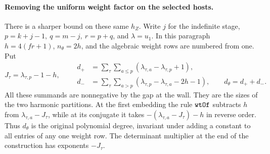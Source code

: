\paragraph{Removing the uniform weight factor on the selected hosts.}
There is a sharper bound on these same \(h_Z\). Write \(j\) for the
indefinite stage, \(p=k+j-1,\ q=m-j,\ r=p+q\), and \(\lambda=u_1\).
In this paragraph \(h=4(fr+1)\), \(n_\theta=2h\), and the algebraic
weight rows are numbered from one. Put
\[
 J_\tau=\lambda_{\tau,p}-1-h,\qquad
 \begin{aligned}
 d_+&=\sum_\tau\sum_{a\le p}
                 (\lambda_{\tau,a}-\lambda_{\tau,p}+1),\\
 d_-&=\sum_\tau\sum_{a>p}
                 (\lambda_{\tau,p}-\lambda_{\tau,a}-2h-1),\qquad
 d_\theta=d_++d_- .
 \end{aligned}
\]
All these summands are nonnegative by the gap at the wall. They are
the sizes of the two harmonic partitions. At the first embedding
the rule \(\texttt{wtOf}\) subtracts \(h\) from
\(\lambda_{\tau,a}-J_\tau\), while at its conjugate it takes
\(-(\lambda_{\tau,a}-J_\tau)-h\) in reverse order.
Thus \(d_\theta\) is the original polynomial degree, invariant under
adding a constant to all entries of any one weight row.
The determinant multiplier at the end of the construction has
exponents \(-J_\tau\).

